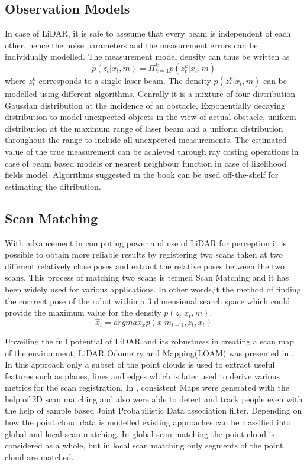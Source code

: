 \subsection{Observation Models}
In case of LiDAR, it is safe to asssume that every beam is independent of each other, hence the noise parameters and the measurement errors can be individually modelled. The measurement model density can
thus be written as 
\begin{equation}
    p(z_t | x_t, m)  = \Pi_{k=1}^k  p(z_t^k | x_t, m)
\end{equation}
where  $z_t^k$ corresponds to a single laser beam. The density $p(z_t^k | x_t, m)$ can be modelled using different algorithms. Genrally it is a mixture of four distribution- Gaussian distribution at the incidence of an obstacle, 
Exponentially decaying distribution to model unexpected objects in the view of actual obstacle, uniform distribution at the maximum range of laser beam and a uniform distribution throughout the range to include all unexpected measurements.
The estimated value of the true measurement can be achieved through ray casting operations in case of beam based models or nearest neighbour function in case of likelihood fields model.
Algorithms suggested in the book \cite{Thrun98aprobabilistic} can be used off-the-shelf for estimating the ditribution.

\subsection{Scan Matching}
    With advancement in computing power and use of
LiDAR for perception it is possible to obtain more reliable results by registering two scans taken at two different relatively close poses and extract the relative poses between the two scans. 
This process of matching two scans is termed Scan Matching and it has been widely used for various applications. In other words,it the method of finding the corrrect pose of the robot within a 3 dimensional
search space which could provide the maximum value for the density $p(z_t | x_t, m)$. 
\begin{equation}
    \hat{x} _{t} = argmax_{x} p(x|m_{t-1}, z_t, x_t)
\end{equation}
\par
Unveiling the full potential of LiDAR and its robustness in creating a scan map of the environment,
LiDAR Odometry and Mapping(LOAM) was presented in \cite{ZhangS14}. In this approach only a subset of the point clouds is used to extract useful features such as planes, lines and edges which is later 
used to derive various metrics for the scan registration. In \cite{D.Hahnel}, consistent Maps were generated with the help of 2D scan matching and also were able to detect and track people
even with the help of sample based Joint Probabilistic Data association filter.
Depending on how the point cloud data is modelled existing approaches can be classified into 
global and local scan matching. In global scan matching the point cloud is considered as a whole, but in local scan matching only segments of the point cloud are matched.

